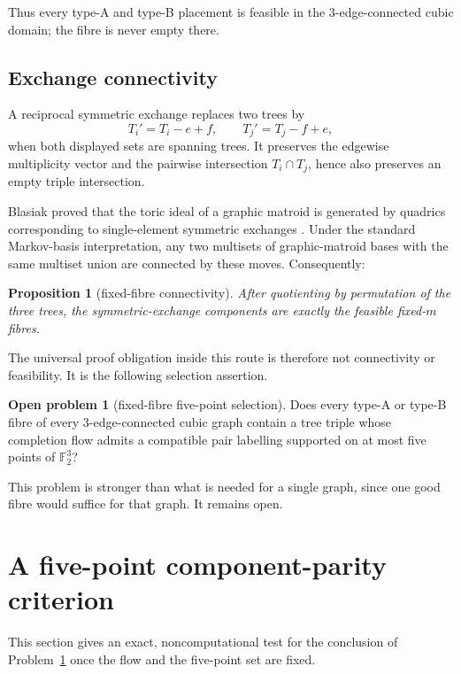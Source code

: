 \documentclass[11pt]{article}
\newtheorem{proposition}[theorem]{Proposition}
\theoremstyle{definition}
\newtheorem{problem}[theorem]{Open problem}
\theoremstyle{remark}
\newcommand{\F}{\mathbb F}
\newcommand{\1}{\mathbf 1}
\begin{document}
Thus every type-A and type-B placement is feasible in the 3-edge-connected
cubic domain; the fibre is never empty there.

\subsection{Exchange connectivity}

A reciprocal symmetric exchange replaces two trees by
\[
 T_i'=T_i-e+f,\qquad T_j'=T_j-f+e,                       \tag{3.7}
\]
when both displayed sets are spanning trees.  It preserves the edgewise
multiplicity vector and the pairwise intersection \(T_i\cap T_j\), hence
also preserves an empty triple intersection.

Blasiak proved that the toric ideal of a graphic matroid is generated by
quadrics corresponding to single-element symmetric exchanges
\cite{Blasiak2008}.  Under the standard Markov-basis interpretation, any
two multisets of graphic-matroid bases with the same multiset union are
connected by these moves.  Consequently:

\begin{proposition}[fixed-fibre connectivity]\label{prop:fibre}
After quotienting by permutation of the three trees, the
symmetric-exchange components are exactly the feasible fixed-\(m\)
fibres.
\end{proposition}

The universal proof obligation inside this route is therefore not
connectivity or feasibility.  It is the following selection assertion.

\begin{problem}[fixed-fibre five-point selection]\label{prob:fibre}
Does every type-A or type-B fibre of every 3-edge-connected cubic graph
contain a tree triple whose completion flow admits a compatible pair
labelling supported on at most five points of \(\F_2^3\)?
\end{problem}

This problem is stronger than what is needed for a single graph, since one
good fibre would suffice for that graph.  It remains open.

\section{A five-point component-parity criterion}

This section gives an exact, noncomputational test for the conclusion of
Problem~\ref{prob:fibre} once the flow and the five-point set are fixed.
\end{document}
